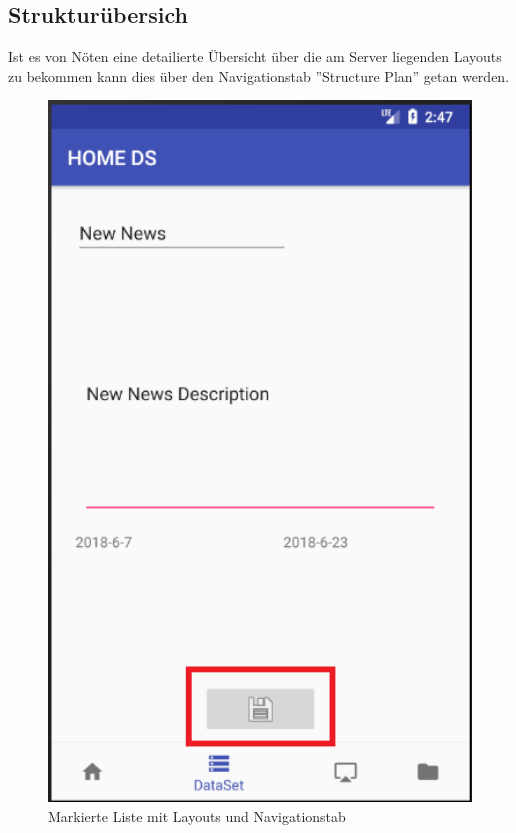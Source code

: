 \subsection{Strukturübersich}
Ist es von Nöten eine detailierte Übersicht über die am Server liegenden Layouts zu bekommen kann dies über den Navigationstab ''Structure Plan'' getan werden. 
\\
\begin{figure}[H]
\centering
\includegraphics[width=1.0\textwidth]{images/06_AndroidApp/06_EditNewsSaveButton}
\caption{Markierte Liste mit Layouts und Navigationstab}
\label{fig:mediaNav}
\end{figure}
